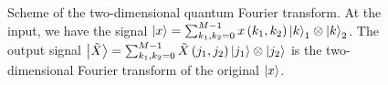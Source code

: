 \begin{figure}
\centering



\caption{Scheme of the two-dimensional quantum Fourier transform. At the input, we have the signal $\ket{x} = \sum_{k_1,k_2=0}^{M-1} x\left(k_1, k_2\right)\ket{k}_1 \otimes \ket{k}_2$. The output signal $\ket{\tilde{X}} = \sum_{k_1,k_2=0}^{M-1} \tilde{X}\left(j_1, j_2\right) \ket{j_1} \otimes \ket{j_2}$ is the two-dimensional Fourier transform of the original $\ket{x}$.}
\label{figQuantCompQuantFourier2d}
\end{figure}